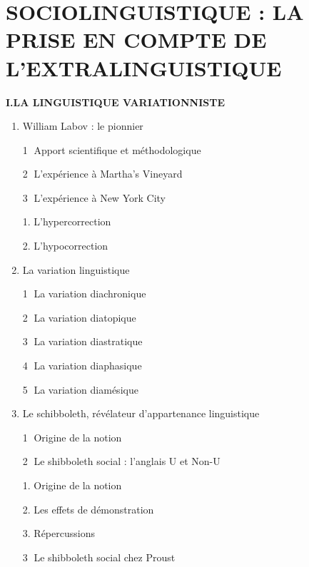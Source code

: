 
\chapter{SOCIOLINGUISTIQUE : LA PRISE EN COMPTE DE L’EXTRALINGUISTIQUE}
\label{chapter-13}
\begin{keybox}
\small{}
\textbf{I.\quad LA LINGUISTIQUE VARIATIONNISTE}
\begin{enumerate}[label=\arabic*.]
\item William Labov : le pionnier\par \textcircled{\scriptsize 1} Apport scientifique et méthodologique\par \textcircled{\scriptsize 2} L’expérience à Martha’s Vineyard\par \textcircled{\scriptsize 3} L’expérience à New York City\par\hspace*{1em}1. L’hypercorrection\par\hspace*{1em}2. L’hypocorrection
\item La variation linguistique\par \textcircled{\scriptsize 1} La variation diachronique\par \textcircled{\scriptsize 2} La variation diatopique\par \textcircled{\scriptsize 3} La variation diastratique\par \textcircled{\scriptsize 4} La variation diaphasique\par \textcircled{\scriptsize 5} La variation diamésique
\item Le schibboleth, révélateur d’appartenance linguistique\par \textcircled{\scriptsize 1} Origine de la notion\par \textcircled{\scriptsize 2} Le shibboleth social : l’anglais U et Non-U\par\hspace*{1em}1. Origine de la notion\par\hspace*{1em}2. Les effets de démonstration\par\hspace*{1em}3. Répercussions\par \textcircled{\scriptsize 3} Le shibboleth social chez Proust

\end{enumerate}
\end{keybox}
